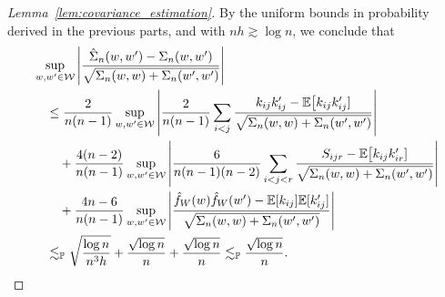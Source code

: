 \begin{proof}[Lemma~\ref{lem:covariance_estimation}]

  By the uniform bounds in probability
  derived in the previous parts,
  and with $nh \gtrsim \log n$,
  we conclude that
  \begin{align*}
    &\sup_{w,w' \in \mathcal{W}}
    \left|
    \frac{\hat \Sigma_n(w,w') - \Sigma_n(w,w')}
    {\sqrt{\Sigma_n(w,w) + \Sigma_n(w',w')}} 
    \right| \\
    &\quad\leq
    \frac{2}{n(n-1)}
    \sup_{w,w' \in \mathcal{W}}
    \left|
    \frac{2}{n(n-1)}
    \sum_{i<j}
    \frac{k_{ij} k_{ij}' - \mathbb{E}\big[k_{ij} k_{ij}']}
    {\sqrt{\Sigma_n(w,w) + \Sigma_n(w',w')}}
    \right| \\
    &\qquad+
    \frac{4(n-2)}{n(n-1)}
    \sup_{w,w' \in \mathcal{W}}
    \left|
    \frac{6}{n(n-1)(n-2)}
    \sum_{i<j<r}
    \frac{S_{ijr} - \mathbb{E}\big[k_{ij} k_{ir}']}
    {\sqrt{\Sigma_n(w,w) + \Sigma_n(w',w')}}
    \right| \\
    &\qquad+
    \frac{4n-6}{n(n-1)}
    \sup_{w,w' \in \mathcal{W}}
    \left|
    \frac{\hat f_W(w) \hat f_W(w') - \mathbb{E}[k_{ij}] \mathbb{E}[k_{ij}']}
    {\sqrt{\Sigma_n(w,w) + \Sigma_n(w',w')}}
    \right| \\
    &\quad\lesssim_{\mathbb{P}}
    \sqrt{\frac{\log n}{n^3h}}
    + \frac{\sqrt{\log n}}{n}
    + \frac{\sqrt{\log n}}{n}
    \lesssim_{\mathbb{P}}
    \frac{\sqrt{\log n}}{n}.
  \end{align*}
\end{proof}

